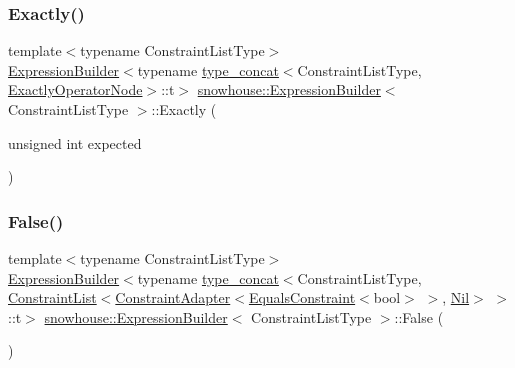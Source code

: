 \mbox{\label{structsnowhouse_1_1ExpressionBuilder_aeacedc8fc8c1302853fc4a4f842b87c7}} 
\subsubsection{\texorpdfstring{Exactly()}{Exactly()}}
{\footnotesize\ttfamily template$<$typename Constraint\+List\+Type$>$ \\
\mbox{\hyperlink{structsnowhouse_1_1ExpressionBuilder}{Expression\+Builder}}$<$typename \mbox{\hyperlink{structsnowhouse_1_1type__concat}{type\+\_\+concat}}$<$Constraint\+List\+Type, \mbox{\hyperlink{structsnowhouse_1_1ExpressionBuilder_af776b29f6fb154ca3179a31fdbcc92c5}{Exactly\+Operator\+Node}}$>$\+::t$>$ \mbox{\hyperlink{structsnowhouse_1_1ExpressionBuilder}{snowhouse\+::\+Expression\+Builder}}$<$ Constraint\+List\+Type $>$\+::Exactly (\begin{DoxyParamCaption}\item[{unsigned int}]{expected }\end{DoxyParamCaption})\hspace{0.3cm}{\ttfamily [inline]}}

\mbox{\label{structsnowhouse_1_1ExpressionBuilder_a4d6100ada93a921ef65929572ac7a2d1}} 
\subsubsection{\texorpdfstring{False()}{False()}}
{\footnotesize\ttfamily template$<$typename Constraint\+List\+Type$>$ \\
\mbox{\hyperlink{structsnowhouse_1_1ExpressionBuilder}{Expression\+Builder}}$<$typename \mbox{\hyperlink{structsnowhouse_1_1type__concat}{type\+\_\+concat}}$<$Constraint\+List\+Type, \mbox{\hyperlink{structsnowhouse_1_1ConstraintList}{Constraint\+List}}$<$\mbox{\hyperlink{structsnowhouse_1_1ConstraintAdapter}{Constraint\+Adapter}}$<$\mbox{\hyperlink{structsnowhouse_1_1EqualsConstraint}{Equals\+Constraint}}$<$bool$>$ $>$, \mbox{\hyperlink{structsnowhouse_1_1Nil}{Nil}}$>$ $>$\+::t$>$ \mbox{\hyperlink{structsnowhouse_1_1ExpressionBuilder}{snowhouse\+::\+Expression\+Builder}}$<$ Constraint\+List\+Type $>$\+::False (\begin{DoxyParamCaption}{ }\end{DoxyParamCaption})\hspace{0.3cm}{\ttfamily [inline]}}

